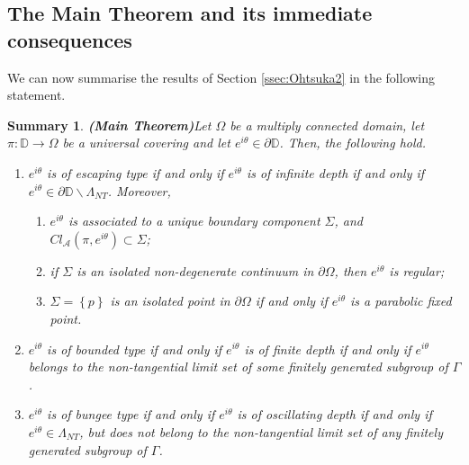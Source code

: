 \documentclass[11pt,a4paper,reqno]{amsart}
\theoremstyle{plain}
\newtheorem{summ}[thm]{Summary}
\theoremstyle{definition}
\theoremstyle{plain}
\begin{document}
\subsection{The Main Theorem and its immediate consequences}\label{subsect-proof-main-result}
We can now summarise the results of Section \ref{ssec:Ohtsuka2} in the following statement.
\begin{summ}{\bf (Main Theorem)}\label{thm-main-result-complete}
	Let $ \Omega $ be a multiply connected domain, let $ \pi\colon \mathbb{D}\to\Omega $ be a universal covering and let $ e^{i\theta} \in\partial\mathbb{D}$. Then, the following hold.
		\begin{enumerate}[label={\normalfont (\alph*)}]
		\item $ e^{i\theta} $ is of escaping type if and only if $ e^{i\theta} $ is of infinite depth if and only if $ e^{i\theta} \in\partial\mathbb{D}\smallsetminus \Lambda_{NT}$. Moreover,\label{item:MTescaping}
		\begin{enumerate}[label={\normalfont (\roman*)}]
			\item $ e^{i\theta} $ is associated to a unique boundary component $ \Sigma $, and $ Cl_\mathcal{A}(\pi, e^{i\theta})\subset\Sigma$;
			\item if $ \Sigma $ is an  isolated non-degenerate continuum in $ \partial \Omega $, then $ e^{i\theta} $ is regular;
			\item $ \Sigma=\left\lbrace p\right\rbrace  $ is an isolated point in $ \partial \Omega $ if and only if $ e^{i\theta} $ is a parabolic fixed point.
		\end{enumerate}
		\item $ e^{i\theta} $ is of bounded type if and only if $ e^{i\theta} $ is of finite depth if and only if $e^{i\theta}$belongs to the non-tangential limit set of some finitely generated subgroup of $\Gamma$.\label{item:MTbounded}
		\item $ e^{i\theta} $ is of bungee type if and only if $ e^{i\theta} $ is of oscillating depth if and only if $e^{i\theta}\in \Lambda_{NT}$, but does not belong to the non-tangential limit set of any finitely generated subgroup of $\Gamma$. 
		

\end{enumerate}
\end{summ}
\end{document}

